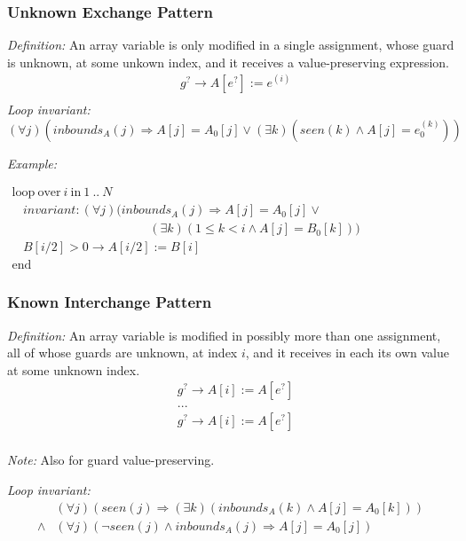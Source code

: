 \documentclass[a4paper,10pt]{article}
\newcommand{\idx}{\ensuremath{i}\xspace}
\newcommand{\at}[1]{{(#1)}}
\newcommand{\KWloop}{\ensuremath{\mathrm{loop}~}}
\newcommand{\KWend}{\ensuremath{\mathrm{end}~}}
\newcommand{\KWover}{\ensuremath{\mathrm{over}~}}
\newcommand{\KWin}{\ensuremath{~\mathrm{in}~}}
\newcommand{\impl}{\ensuremath{\Longrightarrow}}
\newcommand{\inbounds}[2]{\ensuremath{\mathit{inbounds}_{#1}(#2)}\xspace}
\newcommand{\seen}[1]{\ensuremath{\mathit{seen}(#1)}\xspace}
\newcommand{\loopinvariant}{\noindent\textit{Loop invariant:}\xspace}
\newcommand{\patterndef}{\noindent\textit{Definition:}\xspace}
\newcommand{\patternexample}{\noindent\textit{Example:}\xspace}
\newcommand{\patternnote}{\noindent\textit{Note:}\xspace}
\begin{document}
\subsubsection*{Unknown Exchange Pattern}

\patterndef An array variable is only modified in a single assignment,
whose guard is unknown, at some unkown index, and it receives a value-preserving expression.
%
\begin{eqnarray*}
&g^? \rightarrow A[e^?] := e^\at{\idx}\\
\end{eqnarray*}
%
\loopinvariant
%
$$(\forall j)(\inbounds{A}{j} \impl A[j] = A_0[j] \lor (\exists k)(\seen{k} \land A[j] = e_0^\at{k}))$$

\bigskip
\patternexample

\medskip
$\begin{array}{l}
  \KWloop \KWover i \KWin 1~..~N \\
  ~~~~ \textit{invariant}: (\forall j)(\inbounds{A}{j} \impl A[j] = A_0[j] \lor \\
  ~~~~~~~~~~~~~~~~~~~~~~~~~~~~~~~~~~~~~~~~~~~~~~~~~~ (\exists k)(1 \leq k < i \land A[j] = B_0[k]))\\
  ~~~~ B[i/2] > 0 \rightarrow A[i/2] := B[i]\\
  \KWend
\end{array}$

\subsubsection*{Known Interchange Pattern}

\patterndef An array variable is modified in possibly more than one assignment,
all of whose guards are unknown, at index \idx, and it receives in each
its own value at some unknown index.
%
\begin{eqnarray*}
&g^? \rightarrow A[\idx] := A[e^?]\\
&...\\
&g^? \rightarrow A[\idx] := A[e^?]\\
\end{eqnarray*}

\patternnote Also for guard value-preserving.

\medskip
\loopinvariant
%
\begin{eqnarray*}
&(\forall j)(\seen{j} \impl (\exists k)(\inbounds{A}{k} \land A[j] = A_0[k])) \\
\land&
(\forall j)(\neg \seen{j} \land \inbounds{A}{j} \impl A[j] = A_0[j])
\end{eqnarray*}
\end{document}
